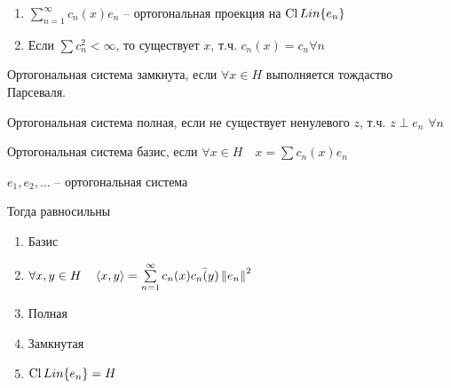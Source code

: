 \begin{remarks}\thmslashn
	
	\begin{enumerate}
		\item 
		$\sum\limits_{n = 1}^\infty c_n(x)e_n$ -- ортогональная проекция на $\operatorname{Cl} Lin\{e_n\}$
		
		\item 
		Если $\sum c_n^2 < \infty$, то существует $x$, т.ч. $c_n(x) = c_n \forall n$
		
	\end{enumerate}
	
\end{remarks}

\begin{definition}\thmslashn
	
	Ортогональная система замкнута, если $\forall x\in H$ выполняется тождаство Парсеваля. 
	
	Ортогональная система полная, если не существует ненулевого $z$, т.ч. $z \perp e_n\,\,\forall n$
	
	Ортогональная система базис, если $\forall x \in H\quad x = \sum c_n(x) e_n$ 
	
\end{definition}

\begin{theorem}\thmslashn 
	
	$e_1, e_2, \ldots$ -- ортогональная система
	
	Тогда равносильны 
	
	\begin{enumerate}
		\item 
		Базис
		
		\item
		$\forall x, y \in H \quad \left\langle x, y\right\rangle = \sum\limits_{n = 1}^{\infty}c_n(x)\bar{c_n(y)} \left\|e_n\right\|^2$
		
		\item
		Полная 
		
		\item
		Замкнутая
		
		\item
		$\operatorname{Cl} Lin\{e_n\} = H$
		
	\end{enumerate}
\end{theorem}

